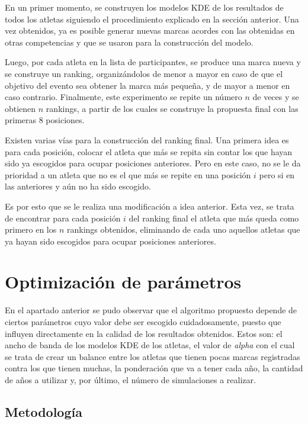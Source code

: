 En un primer momento, se construyen los modelos KDE de los resultados de todos los atletas siguiendo el procedimiento explicado en la sección anterior. Una vez obtenidos, ya es posible generar nuevas marcas acordes con las obtenidas en otras competencias y que se usaron para la construcción del modelo.

Luego, por cada atleta en la lista de participantes, se produce una marca nueva y se construye un ranking, organizándolos de menor a mayor en caso de que el objetivo del evento sea obtener la marca más pequeña, y de mayor a menor en caso contrario. Finalmente, este experimento se repite un número $n$ de veces y se obtienen $n$ rankings, a partir de los cuales se construye la propuesta final con las primeras 8 posiciones.

Existen varias vías para la construcción del ranking final. Una primera idea es para cada posición, colocar el atleta que más se repita sin contar los que hayan sido ya escogidos para ocupar posiciones anteriores. Pero en este caso, no se le da prioridad a un atleta que no es el que más se repite en una posición $i$ pero si en las anteriores y aún no ha sido escogido.

Es por esto que se le realiza una modificación a idea anterior. Esta vez, se trata de encontrar para cada posición $i$ del ranking final el atleta que más queda como primero en los $n$ rankings obtenidos, eliminando de cada uno  aquellos atletas que ya hayan sido escogidos para ocupar posiciones anteriores.

\section{Optimización de parámetros}\label{sec:params_opt}

En el apartado anterior se pudo observar que el algoritmo propuesto depende de ciertos parámetros cuyo valor debe ser escogido cuidadosamente, puesto que influyen directamente en la calidad de los resultados obtenidos. Estos son: el ancho de banda de los modelos KDE de los atletas, el valor de \textit{alpha} con el cual se trata de crear un balance entre los atletas que tienen pocas marcas registradas contra los que tienen muchas, la ponderación que va a tener cada año, la cantidad de años a utilizar y, por último, el número de simulaciones a realizar.

\subsection{Metodología}

